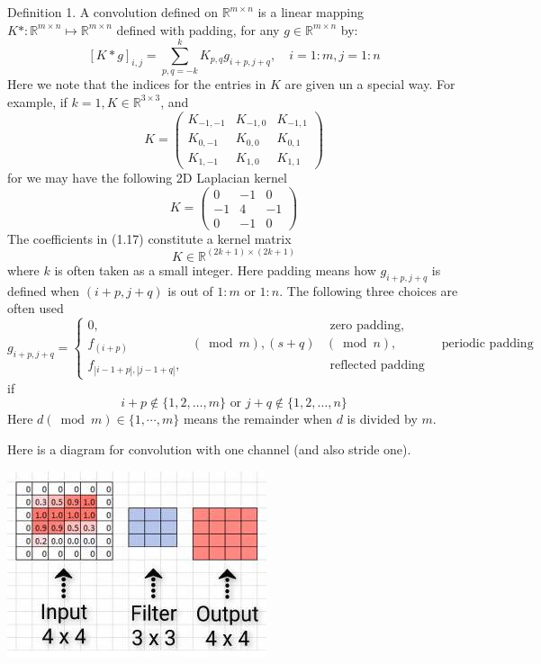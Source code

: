 \documentclass[10pt]{article}
\begin{document}
Definition 1. A convolution defined on $\mathbb{R}^{m \times n}$ is a linear mapping $K *: \mathbb{R}^{m \times n} \mapsto \mathbb{R}^{m \times n}$ defined with padding, for any $g \in \mathbb{R}^{m \times n}$ by:
$$
[K * g]_{i, j}=\sum_{p, q=-k}^{k} K_{p, q} g_{i+p, j+q}, \quad i=1: m, j=1: n
$$
Here we note that the indices for the entries in $K$ are given un a special way. For example, if $k=1, K \in \mathbb{R}^{3 \times 3}$, and
$$
K=\left(\begin{array}{ccc}
K_{-1,-1} & K_{-1,0} & K_{-1,1} \\
K_{0,-1} & K_{0,0} & K_{0,1} \\
K_{1,-1} & K_{1,0} & K_{1,1}
\end{array}\right)
$$
for we may have the following 2D Laplacian kernel
$$
K=\left(\begin{array}{ccc}
0 & -1 & 0 \\
-1 & 4 & -1 \\
0 & -1 & 0
\end{array}\right)
$$
The coefficients in (1.17) constitute a kernel matrix
$$
K \in \mathbb{R}^{(2 k+1) \times(2 k+1)}
$$
where $k$ is often taken as a small integer. Here padding means how $g_{i+p, j+q}$ is defined when $(i+p, j+q)$ is out of $1: m$ or $1: n$. The following three choices are often used
$$
g_{i+p, j+q}=\left\{\begin{array}{lll}
0, & & \text { zero padding, } \\
f_{(i+p)} & (\bmod m),(s+q) & (\bmod n), & \text { periodic padding } \\
f_{|i-1+p|,|j-1+q|}, & & \text { reflected padding }
\end{array}\right.
$$
if
$$
i+p \notin\{1,2, \ldots, m\} \text { or } j+q \notin\{1,2, \ldots, n\}
$$
Here $d(\bmod m) \in\{1, \cdots, m\}$ means the remainder when $d$ is divided by $m$.

Here is a diagram for convolution with one channel (and also stride one).

\includegraphics[max width=\textwidth]{2022_01_06_b5ce182ed1bd5f482e5bg-05}
\end{document}
